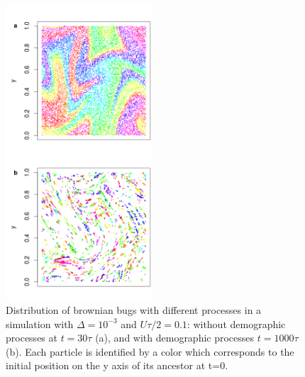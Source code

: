 \begin{figure}[H]
\begin{center}
\includegraphics[width=0.49\textwidth]{../code/figure/spatial_distribution_Fig2.png}
  \caption{Distribution of brownian bugs with different processes in a simulation with $\Delta=10^{-3}$ and $U\tau/2=0.1$: without demographic processes at $t=30\tau$ (a), and with demographic processes $t=1000\tau$ (b). Each particle is identified by a color which corresponds to the initial position on the y axis of its ancestor at t=0.}
  \label{fig:spatial_fig2}
\end{center}
  \end{figure}

